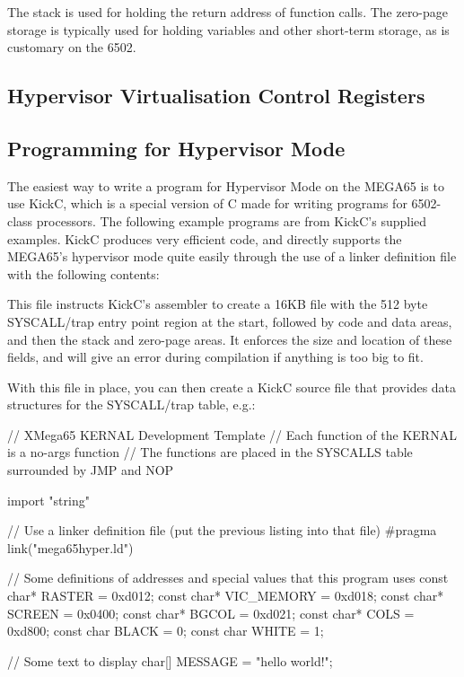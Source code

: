 The stack is used for holding the return address of function calls.  The zero-page storage is typically used for holding
variables and other short-term storage, as is customary on the 6502.

\subsection{Hypervisor Virtualisation Control Registers}



\subsection{Programming for Hypervisor Mode}

The easiest way to write a program for Hypervisor Mode on the MEGA65 is to use KickC, which is a special version of C
made for writing programs for 6502-class processors.  The following example programs are from KickC's supplied examples.
KickC produces very efficient code, and directly supports the MEGA65's
hypervisor mode quite easily through the use of a linker definition file with the following contents:


This file instructs KickC's assembler to create a 16KB file with the 512 byte SYSCALL/trap entry point region at the start,
followed by code and data areas, and then the stack and zero-page areas. It enforces the size and location of these fields, and
will give an error during compilation if anything is too big to fit.

With this file in place, you can then create a KickC source file that provides data structures for the SYSCALL/trap table, e.g.:

\begin{screenoutput}
// XMega65 KERNAL Development Template
// Each function of the KERNAL is a no-args function
// The functions are placed in the SYSCALLS table surrounded by JMP and NOP

import "string"

// Use a linker definition file (put the previous listing into that file)
#pragma link("mega65hyper.ld")

// Some definitions of addresses and special values that this program uses
const char* RASTER = 0xd012;
const char* VIC_MEMORY = 0xd018;
const char* SCREEN = 0x0400;
const char* BGCOL = 0xd021;
const char* COLS = 0xd800;
const char BLACK = 0;
const char WHITE = 1;

// Some text to display
char[] MESSAGE = "hello world!";
\end{screenoutput}

